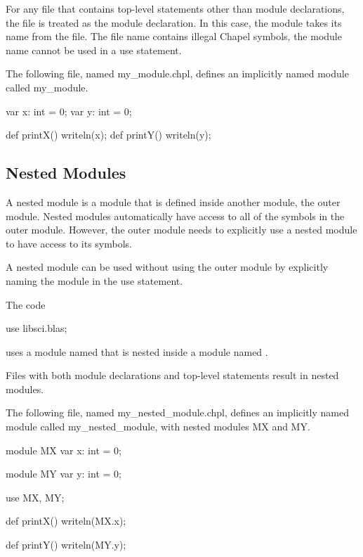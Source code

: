 For any file that contains top-level statements other than module
declarations, the file is treated as the module declaration.  In this
case, the module takes its name from the file.  The file name contains
illegal Chapel symbols, the module name cannot be used in a use
statement.


\begin{example}
The following file, named my\_module.chpl, defines an implicitly named
module called my\_module.
\begin{chapelcode}
var x: int = 0;
var y: int = 0;

def printX() {
  writeln(x);
}
def printY() {
  writeln(y);
}
\end{chapelcode}
\end{example}


\subsection{Nested Modules}
\label{Nested_Modules}

A nested module is a module that is defined inside another module, the
outer module.  Nested modules automatically have access to all of the
symbols in the outer module.  However, the outer module needs to
explicitly use a nested module to have access to its symbols.

A nested module can be used without using the outer module by
explicitly naming the module in the use statement.
\begin{example}
The code
\begin{chapel}
use libsci.blas;
\end{chapel}
uses a module named  that is nested inside a module
named .
\end{example}

Files with both module declarations and top-level statements result in
nested modules.

\begin{example}
The following file, named my\_nested\_module.chpl, defines an
implicitly named module called my\_nested\_module, with nested modules
MX and MY.
\begin{chapelcode}
module MX {
  var x: int = 0;
}

module MY {
  var y: int = 0;
}

use MX, MY;

def printX() {
  writeln(MX.x);
}

def printY() {
  writeln(MY.y);
}
\end{chapelcode}
\end{example}


